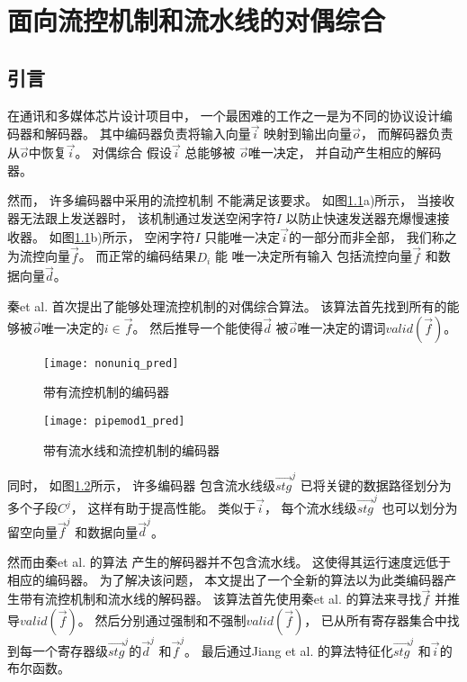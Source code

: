 


\chapter{面向流控机制和流水线的对偶综合}
\label{chap:4}

\section{引言}\label{sec_intro}
在通讯和多媒体芯片设计项目中，
一个最困难的工作之一是为不同的协议设计编码器和解码器。
其中编码器负责将输入向量$\vec{i}$ 映射到输出向量$\vec{o}$，
而解码器负责从$\vec{o}$中恢复$\vec{i}$。
对偶综合\cite{ShenICCAD09,ShenTCAD11,ShenTCAD12,LiuICCAD11,LiuTCAD12,TuDAC13}
假设$\vec{i}$ 总能够被 $\vec{o}$唯一决定，
并自动产生相应的解码器。

然而，
许多编码器中采用的流控机制\cite{flowcontrol}
不能满足该要求。
如图\ref{fig_fc}a)所示，
当接收器无法跟上发送器时，
该机制通过发送空闲字符$I$ 以防止快速发送器充爆慢速接收器。
如图\ref{fig_fc}b)所示，
空闲字符$I$
只能唯一决定$\vec{i}$的一部分而非全部，
我们称之为流控向量$\vec{f}$。
而正常的编码结果$D_i$ 能
唯一决定所有输入
包括流控向量$\vec{f}$ 和数据向量$\vec{d}$。

秦et al. \cite{QinTODAES15} 首次提出了能够处理流控机制的对偶综合算法。
该算法首先找到所有的能够被$\vec{o}$唯一决定的$i\in\vec{f}$。
然后推导一个能使得$\vec{d}$ 被$\vec{o}$唯一决定的谓词$valid(\vec{f})$。

\begin{figure}[t]
\centering
\texttt{[image: nonuniq\_pred]}
\caption{带有流控机制的编码器}
\label{fig_fc}
\end{figure}

\begin{figure}[b]
\centering
\texttt{[image: pipemod1\_pred]}
\caption{带有流水线和流控机制的编码器}
\label{fig_pipeenc}
\end{figure}



同时，
如图\ref{fig_pipeenc}所示，
许多编码器
包含流水线级$\vec{stg}^j$ 已将关键的数据路径划分为多个子段$C^j$，
这样有助于提高性能。
类似于$\vec{i}$，
每个流水线级$\vec{stg}^j$ 也可以划分为留空向量$\vec{f}^j$ 和数据向量$\vec{d}^j$。

然而由秦et al. 的算法\cite{QinTODAES15} 产生的解码器并不包含流水线。
这使得其运行速度远低于相应的编码器。
为了解决该问题，
本文提出了一个全新的算法以为此类编码器产生带有流控机制和流水线的解码器。
该算法首先使用秦et al. \cite{QinTODAES15}的算法来寻找$\vec{f}$ 并推导$valid(\vec{f})$。
然后分别通过强制和不强制$valid(\vec{f})$，
已从所有寄存器集合中找到每一个寄存器级$\vec{stg}^j$的$\vec{d}^j$ 和$\vec{f}^j$。
最后通过Jiang et al. \cite{InterpBoolFunction}的算法特征化$\vec{stg}^j$ 和$\vec{i}$的布尔函数。


